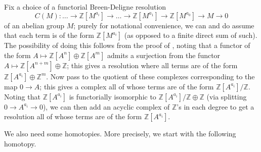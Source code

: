 Fix a choice of a functorial Breen-Deligne resolution
\[
C(M):\ldots \to \mathbb Z[M^{a_i}]\to\ldots\to\mathbb
Z[M^{a_1}]\to\mathbb Z[M^{a_0}]\to M\to 0
\]
of an abelian group $M$; purely for notational convenience, we can and do assume that each term is of the form $\mathbb Z[M^{a_i}]$ (as opposed to a finite direct sum of such). The possibility of doing this follows from the proof of \cite[Theorem 4.10]{Condensed}, noting that a functor of the form $A\mapsto \mathbb Z[A^n]\oplus \mathbb Z[A^m]$ admits a surjection from the functor $A\mapsto \mathbb Z[A^{n+m}]\oplus \mathbb Z$; this gives a resolution where all terms are of the form $\mathbb Z[A^{a_i}]\oplus \mathbb Z^m$. Now pass to the quotient of these complexes corresponding to the map $0\to A$; this gives a complex all of whose terms are of the form $\mathbb Z[A^{a_i}]/\mathbb Z$. Noting that $\mathbb Z[A^{a_i}]$ is functorially isomorphic to $\mathbb Z[A^{a_i}]/\mathbb Z\oplus \mathbb Z$ (via splitting $0\to A^{a_i}\to 0$), we can then add an acyclic complex of $\mathbb Z$'s in each degree to get a resolution all of whose terms are of the form $\mathbb Z[A^{a_i}]$.



We also need some homotopies. More precisely, we start with the following homotopy.

